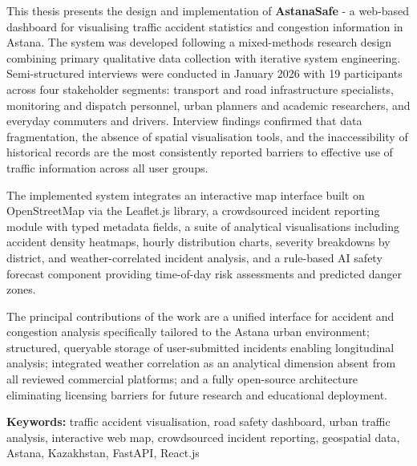 \documentclass[12pt,a4paper]{report}
\begin{document}
This thesis presents the design and implementation of \textbf{AstanaSafe} - a
web-based dashboard for visualising traffic accident statistics and congestion
information in Astana. The system was developed following a mixed-methods research
design combining primary qualitative data collection with iterative system engineering.
Semi-structured interviews were conducted in January 2026 with 19 participants across
four stakeholder segments: transport and road infrastructure specialists, monitoring
and dispatch personnel, urban planners and academic researchers, and everyday
commuters and drivers. Interview findings confirmed that data fragmentation, the
absence of spatial visualisation tools, and the inaccessibility of historical records
are the most consistently reported barriers to effective use of traffic information
across all user groups.
 
The implemented system integrates an interactive map interface built on
OpenStreetMap via the Leaflet.js library, a crowdsourced incident reporting module
with typed metadata fields, a suite of analytical visualisations including accident
density heatmaps, hourly distribution charts, severity breakdowns by district, and
weather-correlated incident analysis, and a rule-based AI safety forecast component
providing time-of-day risk assessments and predicted danger zones. 
 
The principal contributions of the work are a unified interface for accident and
congestion analysis specifically tailored to the Astana urban environment; structured,
queryable storage of user-submitted incidents enabling longitudinal analysis;
integrated weather correlation as an analytical dimension absent from all reviewed
commercial platforms; and a fully open-source architecture eliminating licensing
barriers for future research and educational deployment.
 
\vspace{0.5cm}
\noindent\textbf{Keywords:} traffic accident visualisation, road safety dashboard,
urban traffic analysis, interactive web map, crowdsourced incident reporting,
geospatial data, Astana, Kazakhstan, FastAPI, React.js


\clearpage

\listoftables
\clearpage

\listoffigures
\clearpage

\tableofcontents
\clearpage
\end{document}
